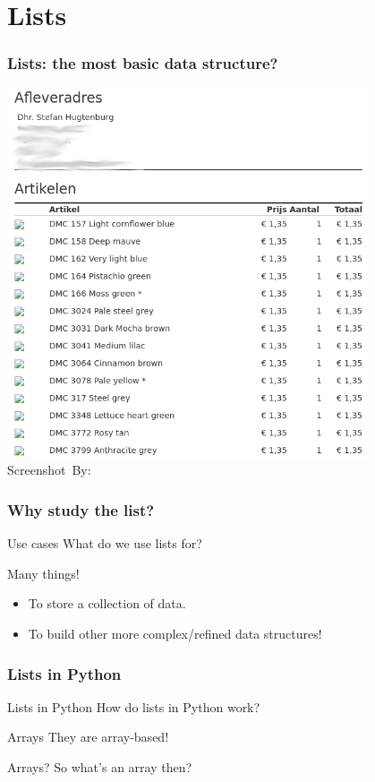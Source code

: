 \section{Lists}
\label{sec:lists}

\begin{frame}
	\frametitle{Lists: the most basic data structure?}
	\begin{center}
		\includegraphics[width=0.8\textwidth]{figures/list.png}\\
		\hspace*{15pt}\hbox{\scriptsize Screenshot By:}
	\end{center}
\end{frame}

\begin{frame}
	\frametitle{Why study the list?}
	\begin{questionblock}{Use cases}
		What do we use lists for?	
	\end{questionblock}
	\pause
	\begin{answerblock}{Many things!}
		\begin{itemize}
			\item To store a collection of data.
				\pause
			\item To build other more complex/refined data structures!
		\end{itemize}
	\end{answerblock}
\end{frame}

\begin{frame}
	\frametitle{Lists in Python}
	\begin{questionblock}{Lists in Python}
		How do lists in Python work?
	\end{questionblock}
	\pause
	\begin{answerblock}{Arrays}
		They are array-based!
	\end{answerblock}
	\pause
	\begin{questionblock}{Arrays?}
		So what's an array then?
	\end{questionblock}
\end{frame}

